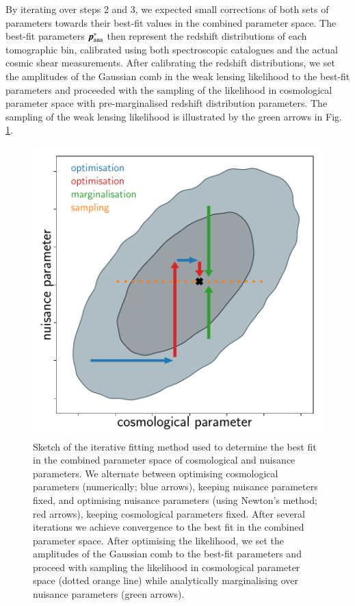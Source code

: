 \documentclass{aa}
\begin{document}
By iterating over steps 2 and 3, we expected small corrections of both sets of parameters towards their best-fit values in the combined parameter space. The best-fit parameters $\boldsymbol{p}^*_{\rm ana}$ then represent the redshift distributions of each tomographic bin, calibrated using both spectroscopic catalogues and the actual cosmic shear measurements. After calibrating the redshift distributions, we set the amplitudes of the Gaussian comb in the weak lensing likelihood to the best-fit parameters and proceeded with the sampling of the likelihood in cosmological parameter space with pre-marginalised redshift distribution parameters. The sampling of the weak lensing likelihood is illustrated by the green arrows in Fig. \ref{fig:iterative_calibration}.
\begin{figure}
\centering
\includegraphics[width=\linewidth]{iterative.pdf}
\caption{Sketch of the iterative fitting method used to determine the best fit in the combined parameter space of cosmological and nuisance parameters. We alternate between optimising cosmological parameters (numerically; blue arrows), keeping nuisance parameters fixed, and optimising nuisance parameters (using Newton's method; red arrows), keeping cosmological parameters fixed. After several iterations we achieve convergence to the best fit in the combined parameter space. After optimising the likelihood, we set the amplitudes of the Gaussian comb to the best-fit parameters and proceed with sampling the likelihood in cosmological parameter space (dotted orange line) while analytically marginalising over nuisance parameters (green arrows).}
\label{fig:iterative_calibration}
\end{figure}
\end{document}
